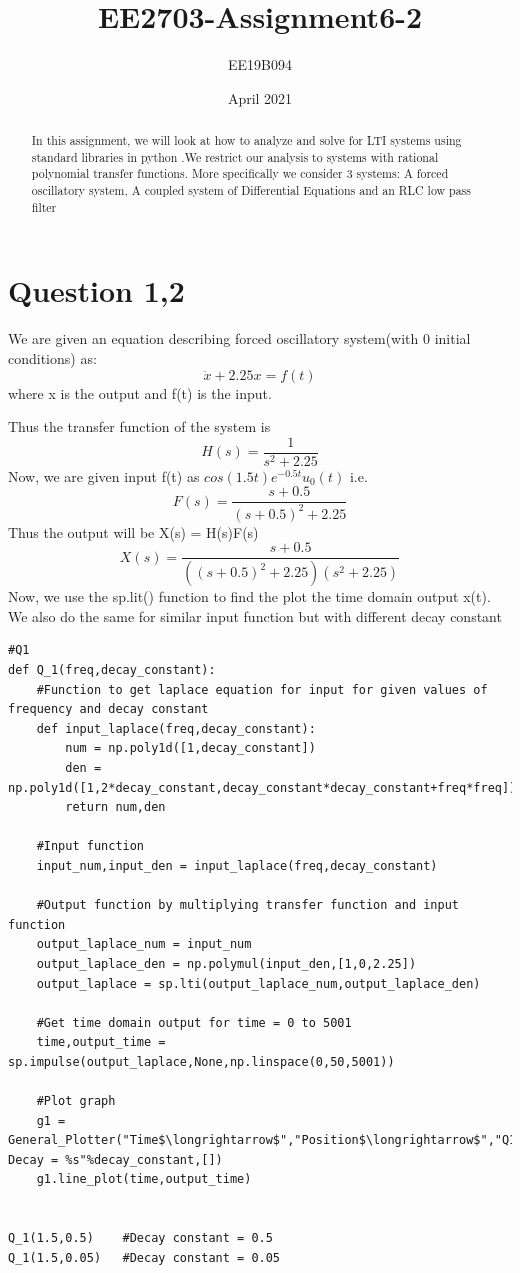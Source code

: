 \documentclass[11pt, a4paper]{article}
\title{EE2703-Assignment6-2}
\author{EE19B094}
\date{April 2021}
\begin{document}
\maketitle
\newpage
\begin{abstract}
    In this assignment, we will look at how to analyze and solve for LTI systems using standard libraries in python .We restrict our analysis to systems with rational polynomial transfer functions. More specifically we consider 3 systems: A forced oscillatory system, A coupled system of Differential Equations and an RLC low pass filter  
\end{abstract}

\section{Question 1,2}
We are given an equation describing forced oscillatory system(with 0 initial conditions) as:
\begin{equation}
    \ddot x + 2.25x = f(t)
\end{equation}
where x is the output and f(t) is the input.

Thus the transfer function of the system is 
\begin{equation}
   H(s) = \frac{1}{s^2+2.25}
\end{equation}
Now, we are given input f(t) as $cos(1.5t)e^{-0.5t}u_0(t)$ i.e.
\begin{equation}
   F(s) = \frac{s+0.5}{(s+0.5)^2+2.25}
\end{equation}
Thus the output will be X(s) = H(s)F(s)
\begin{equation}
   X(s) = \frac{s+0.5}{((s+0.5)^2+2.25)(s^2+2.25)}
\end{equation}
Now, we use the sp.lit() function to find the plot the time domain output x(t).
We also do the same for similar input function but with different decay constant

\begin{lstlisting}
#Q1
def Q_1(freq,decay_constant):
	#Function to get laplace equation for input for given values of frequency and decay constant
	def input_laplace(freq,decay_constant):
		num = np.poly1d([1,decay_constant])
		den = np.poly1d([1,2*decay_constant,decay_constant*decay_constant+freq*freq])
		return num,den

	#Input function
	input_num,input_den = input_laplace(freq,decay_constant)

	#Output function by multiplying transfer function and input function
	output_laplace_num = input_num
	output_laplace_den = np.polymul(input_den,[1,0,2.25])
	output_laplace = sp.lti(output_laplace_num,output_laplace_den)

	#Get time domain output for time = 0 to 5001
	time,output_time = sp.impulse(output_laplace,None,np.linspace(0,50,5001))

	#Plot graph
	g1 = General_Plotter("Time$\longrightarrow$","Position$\longrightarrow$","Q1: Decay = %s"%decay_constant,[])
	g1.line_plot(time,output_time)


Q_1(1.5,0.5)	#Decay constant = 0.5
Q_1(1.5,0.05)	#Decay constant = 0.05
\end{lstlisting}
\end{document}
